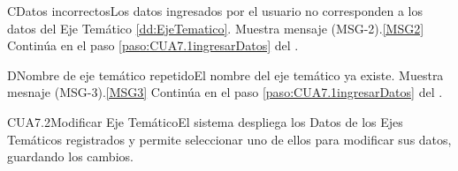 	\begin{UCtrayectoriaA}{C}{Datos incorrectos}{Los datos ingresados por el usuario  no corresponden a los datos del Eje Temático \ref{dd:EjeTematico}.}
			\UCpaso Muestra mensaje (MSG-2).\ref{MSG2}
			\UCpaso Continúa en el paso \ref{paso:CUA7.1ingresarDatos} del .
	\end{UCtrayectoriaA}

	\begin{UCtrayectoriaA}{D}{Nombre de eje temático repetido}{El nombre del eje temático ya existe.}
		\UCpaso Muestra mesnaje (MSG-3).\ref{MSG3}
		\UCpaso Continúa en el paso \ref{paso:CUA7.1ingresarDatos} del .
	\end{UCtrayectoriaA}

	\begin{UseCase}{CUA7.2}{Modificar Eje Temático}{El sistema despliega los Datos de los Ejes Temáticos registrados y permite seleccionar uno de ellos para modificar sus datos, guardando los cambios.}
			\end{UseCase}


